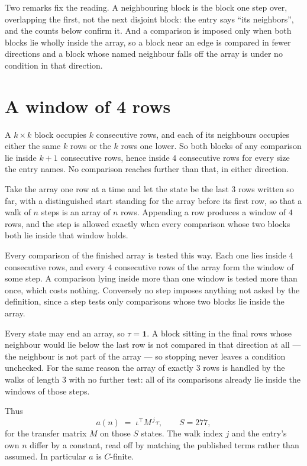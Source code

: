 \documentclass[11pt,a4paper]{article}
\theoremstyle{plain}
\theoremstyle{definition}
\begin{document}
Two remarks fix the reading. A neighbouring block is the block one step over, overlapping the
first, not the next disjoint block: the entry says ``its neighbors'', and the counts below
confirm it. And a comparison is imposed only when both blocks lie wholly inside the array, so a
block near an edge is compared in fewer directions and a block whose named neighbour falls off
the array is under no condition in that direction.

\section{A window of 4 rows}

A $k\times k$ block occupies $k$ consecutive rows, and each of its neighbours occupies either
the same $k$ rows or the $k$ rows one lower. So both blocks of any comparison lie inside $k+1$
consecutive rows, hence inside $4$ consecutive rows for every size the entry names. No
comparison reaches further than that, in either direction.

Take the array one row at a time and let the state be the last 3 rows written so far, with a
distinguished start standing for the array before its first row, so that a walk of $n$ steps is
an array of $n$ rows. Appending a row produces a window of $4$ rows, and the step is
allowed exactly when every comparison whose two blocks both lie inside that window holds.

Every comparison of the finished array is tested this way. Each one lies inside $4$
consecutive rows, and every $4$ consecutive rows of the array form the window of some
step. A comparison lying inside more than one window is tested more than once, which costs
nothing. Conversely no step imposes anything not asked by the definition, since a step tests
only comparisons whose two blocks lie inside the array.

Every state may end an array, so $\tau=\mathbf{1}$. A block sitting in the final rows whose
neighbour would lie below the last row is not compared in that direction at all --- the
neighbour is not part of the array --- so stopping never leaves a condition unchecked. For the
same reason the array of exactly $3$ rows is handled by the walks of length $3$ with no
further test: all of its comparisons already lie inside the windows of those steps.

Thus
\[
a(n)\;=\;\iota^{\!\top}M^{\,j}\tau ,\qquad S=277,
\]
for the transfer matrix $M$ on those $S$ states. The walk index $j$ and the entry's own $n$
differ by a constant, read off by matching the published terms rather than assumed. In
particular $a$ is $C$-finite.
\end{document}
